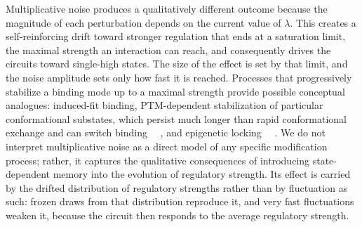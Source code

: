 \documentclass[11pt]{article}
\providecommand{\DIFaddtex}[1]{{\protect\color{red}#1}} %
\providecommand{\DIFdeltex}[1]{} %
\providecommand{\DIFaddbegin}{} %
\providecommand{\DIFaddend}{} %
\providecommand{\DIFdelbegin}{} %
\providecommand{\DIFdelend}{} %
\providecommand{\DIFadd}[1]{\texorpdfstring{\DIFaddtex{#1}}{#1}} %
\providecommand{\DIFdel}[1]{\texorpdfstring{\DIFdeltex{#1}}{}} %
\providecommand{\DIFaddincludegraphics}[2][]{\DIFOincludegraphics[#1]{#2}} %
\providecommand{\DIFdelincludegraphics}[2][]{}
\DeclareRobustCommand{\DIFaddbegin}{\DIFOaddbegin \let\includegraphics\DIFaddincludegraphics} %
\DeclareRobustCommand{\DIFaddend}{\DIFOaddend \let\includegraphics\DIFOincludegraphics} %
\DeclareRobustCommand{\DIFdelbegin}{\DIFOdelbegin \let\includegraphics\DIFdelincludegraphics} %
\DeclareRobustCommand{\DIFdelend}{\DIFOaddend \let\includegraphics\DIFOincludegraphics} %
\begin{document}
Multiplicative noise produces a qualitatively different outcome because the magnitude of each perturbation depends on the current value of $\lambda$. \DIFdelbegin \DIFdel{For inhibitory interactions this }\DIFdelend \DIFaddbegin \DIFadd{This }\DIFaddend creates a self-reinforcing drift toward stronger \DIFdelbegin \DIFdel{repression and consequently }\DIFdelend \DIFaddbegin \DIFadd{regulation that ends at a saturation limit, the maximal strength an interaction can reach, and consequently drives the circuits }\DIFaddend toward single-high states. \DIFdelbegin \DIFdel{PTM-mediated }\DIFdelend \DIFaddbegin \DIFadd{The size of the effect is set by that limit, and the noise amplitude sets only how fast it is reached. Processes that progressively stabilize a binding mode up to a maximal strength provide possible conceptual analogues: induced-fit binding, PTM-dependent }\DIFaddend stabilization of \DIFdelbegin \DIFdel{particular IDP conformers provides one possible conceptual analogue: phosphorylation and other modifications can stabilize }\DIFdelend particular conformational substates\DIFdelbegin \DIFdel{over timescales substantially }\DIFdelend \DIFaddbegin \DIFadd{, which persist much }\DIFaddend longer than rapid conformational exchange \DIFdelbegin \DIFdel{~\mbox{%
\cite{Kulkarni2022, Kulkarni2019}}\hskip0pt%
, allowing past molecular states to influence future regulatory efficacy}\DIFdelend \DIFaddbegin \DIFadd{and can switch binding~\mbox{%
\cite{Kulkarni2022, Kulkarni2019, Bah2015Folding}}\hskip0pt%
, and epigenetic locking~\mbox{%
\cite{Jia2019}}\hskip0pt%
}\DIFaddend . We do not interpret multiplicative noise as a direct model of any specific modification process; rather, it captures the qualitative consequences of introducing state-dependent memory into the evolution of regulatory strength. \DIFdelbegin \DIFdel{Notably, its excess stochastic effect persists even when parameter updates are slowed, indicating a dynamical mechanism distinct from the non-adiabatic expression lag that contributes to the additive-noise phenotype}\DIFdelend \DIFaddbegin \DIFadd{Its effect is carried by the drifted distribution of regulatory strengths rather than by fluctuation as such: frozen draws from that distribution reproduce it, and very fast fluctuations weaken it, because the circuit then responds to the average regulatory strength}\DIFaddend .
\end{document}
